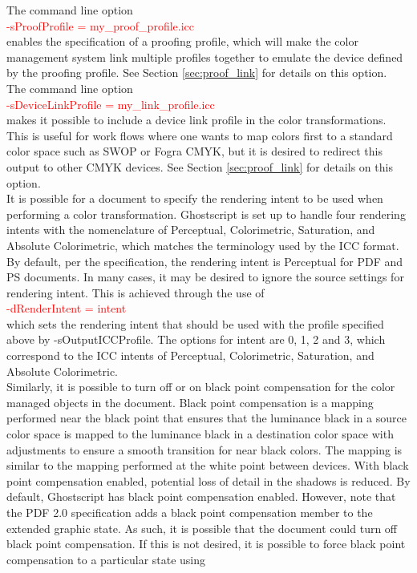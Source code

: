 \documentclass[12pt,notitlepage]{article}
\begin{document}
The command line option\\

\textcolor{red}{-sProofProfile = my\_proof\_profile.icc}\\

\noindent enables the specification of a proofing profile, which will make the color management system link multiple profiles together to emulate the device defined by the proofing profile.  See Section \ref{sec:proof_link} for details on this option.\\

The command line option\\

\textcolor{red}{-sDeviceLinkProfile = my\_link\_profile.icc}\\

 \noindent makes it possible to include a device link profile in the color transformations.  This is useful for work flows where one wants to map colors first to a standard color space such as SWOP or Fogra CMYK, but it is desired to redirect this output to other CMYK devices. See Section \ref{sec:proof_link} for details on this option.\\

It is possible for a document to specify the rendering intent to be used when performing a color transformation.  Ghostscript is set up to handle four rendering intents with the nomenclature of Perceptual, Colorimetric, Saturation, and Absolute Colorimetric, which matches the terminology used by the ICC format.  By default, per the specification, the rendering intent is Perceptual for PDF and PS documents.  In many cases, it may be desired to ignore the source settings for rendering intent.  This is achieved through the use of\\

\textcolor{red}{-dRenderIntent = intent}\\

\noindent which sets the rendering intent that should be used with the profile specified above by -sOutputICCProfile. The options for intent are 0, 1, 2 and 3, which correspond to the ICC intents of Perceptual, Colorimetric, Saturation, and Absolute Colorimetric.\\

Similarly, it is possible to turn off or on black point compensation for the color managed objects in the document.  Black point compensation is a mapping performed near the black point that ensures that the luminance black in a source color space is mapped to the luminance black in a destination color space with adjustments to ensure a smooth transition for near black colors.  The mapping is similar to the mapping performed at the white point between devices. With black point compensation enabled, potential loss of detail in the shadows is reduced.   By default, Ghostscript has black point compensation  enabled.  However, note that the PDF 2.0 specification adds a black point compensation member to the extended graphic state.  As such, it is possible that the document could turn off black point compensation.   If this is not desired, it is possible to force black point compensation to a particular state using\\
\end{document}
